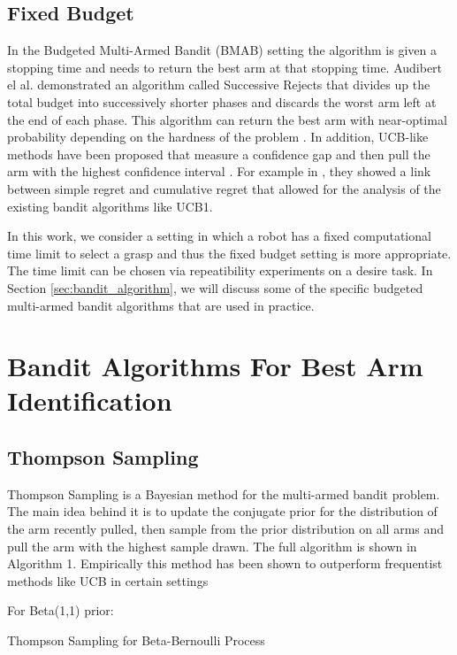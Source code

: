 \documentclass[journal,transmag]{IEEEtran}%
\begin{document}
\subsection{Fixed Budget}
In the Budgeted Multi-Armed Bandit (BMAB) setting the algorithm is given a stopping time and needs to return the best arm at that stopping time. Audibert el al. demonstrated an algorithm called Successive Rejects that divides up the total budget into successively shorter phases and discards the worst arm left at the end of each phase. This algorithm can return the best arm with near-optimal probability depending on the hardness of the problem \cite{audibert2010best}. In addition, UCB-like methods have been proposed that measure a confidence gap and then pull the arm with the highest confidence interval \cite{gabillon2012best}. For example in \cite{bubeck2009pure}, they showed a link between simple regret and cumulative regret that allowed for the analysis of the existing bandit algorithms like UCB1.

In this work, we consider a setting in which a robot has a fixed computational time limit to select a grasp and thus the fixed budget setting is more appropriate. The time limit can be chosen via repeatibility experiments on a desire task. In Section \ref{sec:bandit_algorithm}, we will discuss some of the specific budgeted multi-armed bandit algorithms that are used in practice. 

\label{sec:bandit_algorithm}
\section{Bandit Algorithms For Best Arm Identification}\label{sec:algorithms}
\subsection{Thompson Sampling}
Thompson Sampling is a Bayesian method for the multi-armed bandit problem. The main idea behind it is to update the conjugate prior for the distribution of the arm recently pulled, then sample from the prior distribution on all arms and pull the arm with the highest sample drawn. The full algorithm is shown in Algorithm 1.  Empirically this method has been shown to outperform frequentist methods like UCB in certain settings \cite{chapelle2011empirical} 

\begin{algorithm}
 For Beta(1,1) prior: \\
 \caption{Thompson Sampling for Beta-Bernoulli Process}
\end{algorithm}
\end{document}
